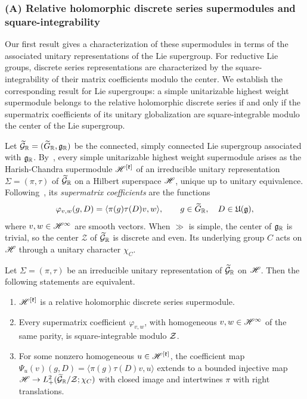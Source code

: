 \subsubsection*{(A) Relative holomorphic discrete series supermodules and square-integrability}

Our first result gives a characterization of these supermodules in terms of the associated unitary representations of the Lie supergroup. For reductive Lie groups, discrete series representations are characterized by the square-integrability of their matrix coefficients modulo the center. We establish the corresponding result for Lie supergroups: a simple unitarizable highest weight supermodule belongs to the relative holomorphic discrete series if and only if the supermatrix coefficients of its unitary globalization are square-integrable modulo the center of the Lie supergroup. 


Let $\widetilde{{\mathcal{G}}}_{{\mathbb R}}=(\widetilde{G}_{{\mathbb R}},{\mathfrak{g}}_{{\mathbb R}})$ be the connected, simply connected Lie supergroup associated with ${\mathfrak{g}}_{{\mathbb R}}$. By~\cite{Carmeli_Fioresi_Varadarajan_Unitary}, every simple unitarizable highest weight supermodule arises as the Harish-Chandra supermodule ${\mathscr{H}}^{[{\mathfrak k}]}$ of an irreducible unitary representation $\Sigma=(\pi,\tau)$ of $\widetilde{{\mathcal{G}}}_{{\mathbb R}}$ on a Hilbert superspace ${\mathscr{H}}$, unique up to unitary equivalence. Following~\cite{NeebSalmasian}, its \emph{supermatrix coefficients} are the functions
\begin{equation*}
\varphi_{v,w}(g,D)=\langle\pi(g)\tau(D)v,w\rangle,
\qquad
g\in\widetilde{G}_{{\mathbb R}},\quad D\in{\mathfrak U}({\mathfrak{g}}),
\end{equation*}
where $v,w\in{\mathscr{H}}^\infty$ are smooth vectors. When $\gg$ is simple, the center of ${\mathfrak{g}}_{{\mathbb R}}$ is trivial, so the center $\mathcal{Z}$ of $\widetilde{{\mathcal{G}}}_{{\mathbb R}}$ is discrete and even. Its underlying group $C$ acts on ${\mathscr{H}}$ through a unitary character $\chi_C$.


\begin{bigthm}\label{thmA}
Let $\Sigma=(\pi,\tau)$ be an irreducible unitary representation of $\widetilde{{\mathcal{G}}}_{{\mathbb R}}$ on ${\mathscr{H}}$. Then the following statements are equivalent.
\begin{enumerate}
\item[(a)] ${\mathscr{H}}^{[{\mathfrak k}]}$ is a relative holomorphic discrete series supermodule.
\item[(b)] Every supermatrix coefficient $\varphi_{v,w}$, with homogeneous $v,w\in{\mathscr{H}}^\infty$ of the same parity, is square-integrable modulo ${\mathcal{Z}}$.
\item[(c)] 
For some nonzero homogeneous $u\in{\mathscr{H}}^{[{\mathfrak k}]}$, the coefficient map $\Psi_u(v)(g,D)=\langle\pi(g)\tau(D)v,u\rangle$ extends to a bounded injective map ${\mathscr{H}}\to L^2_+(\widetilde{{\mathcal{G}}}_{{\mathbb R}}/{\mathcal{Z}};\chi_C)$ with closed image and intertwines $\pi$ with right translations.

\end{enumerate}
\end{bigthm}

